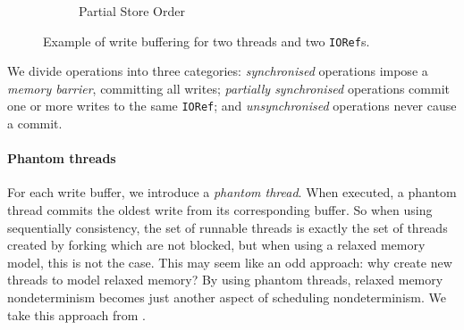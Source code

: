 \begin{figure}
\begin{subfigure}{0.3\textwidth}
    \caption{Partial Store Order}
  \end{subfigure}
  \caption{Example of write buffering for two threads and two \texttt{IORef}s.}
  \label{fig:wb}
\end{figure}

We divide operations into three categories: \emph{synchronised}
operations impose a \emph{memory barrier}, committing all writes;
\emph{partially synchronised} operations commit one or more writes to
the same \verb|IORef|; and \emph{unsynchronised} operations never cause
a commit.

\paragraph{Phantom threads}
For each write buffer, we introduce a \emph{phantom thread}.  When
executed, a phantom thread commits the oldest write from its
corresponding buffer.  So when using sequentially consistency, the set
of runnable threads is exactly the set of threads created by forking
which are not blocked, but when using a relaxed memory model, this is
not the case.  This may seem like an odd approach: why create new
threads to model relaxed memory?  By using phantom threads, relaxed
memory nondeterminism becomes just another aspect of scheduling
nondeterminism.  We take this approach from \cite{zhang2015}.

